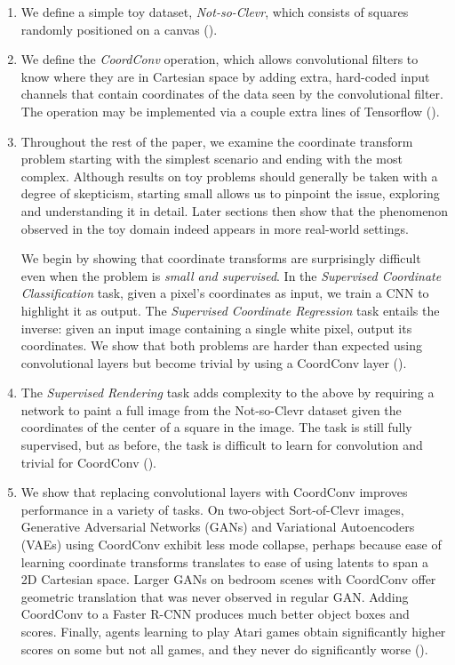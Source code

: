 \documentclass{article}
\begin{document}
\begin{enumerate}
\item We define a simple toy dataset, \emph{Not-so-Clevr}, which consists of squares randomly positioned on a canvas  ().


\item We define the \emph{CoordConv} operation, which allows convolutional filters to know where they are in Cartesian space by adding extra, hard-coded input channels that contain coordinates of the data seen by the convolutional filter. The operation may be implemented via a couple extra lines of Tensorflow ().

\item Throughout the rest of the paper, we examine the coordinate transform problem starting with the simplest scenario and ending with the most complex.
Although results on toy problems should generally be taken with a degree of skepticism, starting small allows us to pinpoint the issue, exploring and understanding it in detail.
Later sections then show that the phenomenon observed in the toy domain indeed appears in more real-world settings.


\vspace{.2em} We begin by showing that coordinate transforms are surprisingly difficult even when the problem is \emph{small and supervised}. In the \emph{Supervised Coordinate Classification} task,
given a pixel's  coordinates as input, we train a CNN to highlight it as output. The \emph{Supervised Coordinate Regression} task entails the inverse:
given an input image containing a single white pixel, output its coordinates. We show that both problems are harder than expected using convolutional layers but become trivial by using a CoordConv layer ().


\item The
\emph{Supervised Rendering} task adds complexity to the above by requiring a network
  to paint a full image from the Not-so-Clevr dataset given the  coordinates of the center of a square in the image.
The task is still fully supervised, but as before, the task is difficult to learn for convolution and trivial for CoordConv ().

\item
  We show that replacing convolutional layers with CoordConv improves performance in a variety of tasks.
On two-object Sort-of-Clevr \cite{sortofclevr} images, Generative Adversarial Networks (GANs) and Variational Autoencoders (VAEs) using CoordConv exhibit
  less mode collapse, perhaps because ease of learning coordinate transforms translates to ease of using latents to span a 2D Cartesian space. Larger GANs on bedroom scenes with CoordConv offer geometric translation that was never observed in regular GAN.
  Adding CoordConv to a Faster R-CNN produces much better object boxes and scores.
  Finally, agents learning to play Atari games obtain significantly higher scores on some but not all games, and they never do significantly worse
  ().


\end{enumerate}
\end{document}
